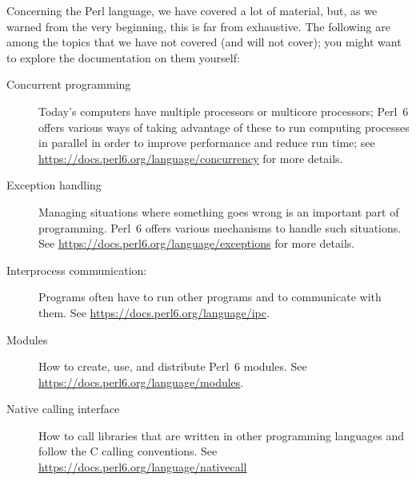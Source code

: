 Concerning the Perl language, we have covered a lot of 
material, but, as we warned from the very beginning, 
this is far from exhaustive. The following are among 
the topics that we have not covered (and will not cover); 
you might want to explore the documentation on them 
yourself:

\begin{description}
\item[Concurrent programming] Today's computers have 
multiple processors or multicore processors; Perl~6 
offers various ways of taking advantage of these to 
run computing processes in parallel in order to 
improve performance and reduce run time; see 
\url{https://docs.perl6.org/language/concurrency} 
for more details.

\item[Exception handling] Managing situations where 
something goes wrong is an important part of 
programming. Perl~6 offers various mechanisms to 
handle such situations. See \url{https://docs.perl6.org/language/exceptions} 
for more details.

\item[Interprocess communication:] Programs often have to 
run other programs and to communicate with them. See 
\url{https://docs.perl6.org/language/ipc}.

\item[Modules] How to create, use, and distribute Perl~6 
modules. See \url{https://docs.perl6.org/language/modules}.

\item[Native calling interface] How to call libraries 
that are written in other programming languages and 
follow the C calling conventions. 
See \url{https://docs.perl6.org/language/nativecall}

\end{description}
